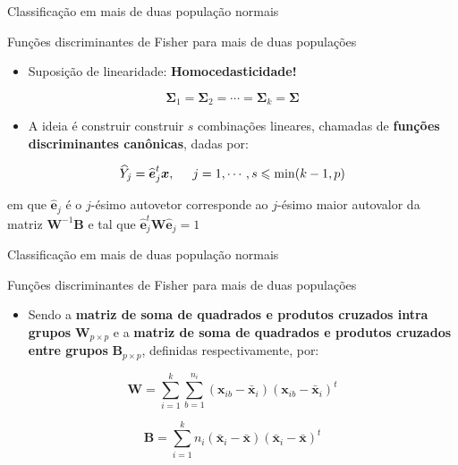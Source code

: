 \documentclass[
  ignorenonframetext,
  aspectratio=169,
]{beamer}
\providecommand{\tightlist}{%
  \setlength{\itemsep}{0pt}\setlength{\parskip}{0pt}}
\begin{document}
\begin{frame}{Classificação em mais de duas população normais}
\label{classificauxe7uxe3o-em-mais-de-duas-populauxe7uxe3o-normais-9}
\begin{block}{Funções discriminantes de Fisher para mais de duas
populações}
\label{funuxe7uxf5es-discriminantes-de-fisher-para-mais-de-duas-populauxe7uxf5es}
\begin{itemize}
\tightlist
\item
  Suposição de linearidade: \textbf{Homocedasticidade!}
\end{itemize}

\[\boldsymbol{\Sigma}_1 = \boldsymbol{\Sigma}_2 = \cdots = \boldsymbol{\Sigma}_k = \boldsymbol{\Sigma}\]

\begin{itemize}
\tightlist
\item
  A ideia é construir construir \(s\) combinações lineares, chamadas de
  \textbf{funções discriminantes canônicas}, dadas por:
\end{itemize}

\[\widehat{Y}_j = \widehat{\boldsymbol{e}}_j^t {\boldsymbol{x}}, \hspace{0.5cm} j = 1, \cdots, s \leqslant \min(k-1,p)\]

em que \(\widehat{\boldsymbol{e}}_j\) é o \(j\)-ésimo autovetor
corresponde ao \(j\)-ésimo maior autovalor da matriz
\(\boldsymbol{W}^{-1}\boldsymbol{B}\) e tal que
\(\widehat{\boldsymbol{e}}_j^t \boldsymbol{W} \widehat{\boldsymbol{e}}_j = 1\)
\end{block}
\end{frame}

\begin{frame}{Classificação em mais de duas população normais}
\label{classificauxe7uxe3o-em-mais-de-duas-populauxe7uxe3o-normais-10}
\begin{block}{Funções discriminantes de Fisher para mais de duas
populações}
\label{funuxe7uxf5es-discriminantes-de-fisher-para-mais-de-duas-populauxe7uxf5es-1}
\begin{itemize}
\tightlist
\item
  Sendo a \textbf{matriz de soma de quadrados e produtos cruzados intra
  grupos} \(\boldsymbol{W}_{p \times p}\) e a \textbf{matriz de soma de
  quadrados e produtos cruzados entre grupos}
  \(\boldsymbol{B}_{p \times p}\), definidas respectivamente, por:
\end{itemize}

\[\boldsymbol{W} = \displaystyle{\sum_{i=1}^k}\displaystyle{\sum_{b=1}^{n_i}}(\boldsymbol{x}_{ib} - \bar{\boldsymbol{x}}_i)(\boldsymbol{x}_{ib} - \bar{\boldsymbol{x}}_i)^t\]

\[\boldsymbol{B} = \displaystyle{\sum_{i=1}^k} n_i (\bar{\boldsymbol{x}}_i - \bar{\boldsymbol{x}})(\bar{\boldsymbol{x}}_i - \bar{\boldsymbol{x}})^t\]
\end{block}
\end{frame}
\end{document}

